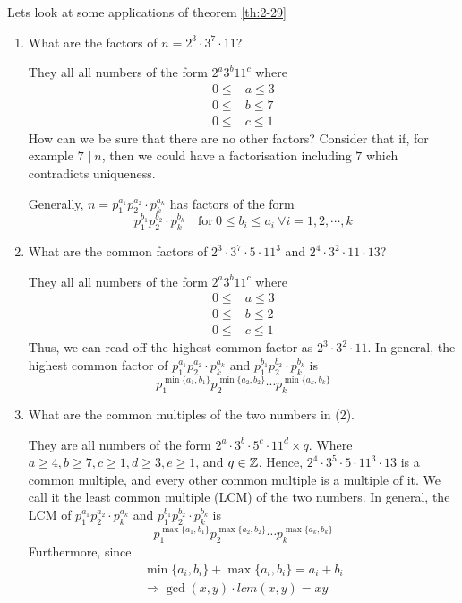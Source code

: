 \documentclass{article}
\begin{document}
Lets look at some applications of theorem \ref{th:2-29}
\begin{enumerate}[label=(\arabic*)]
    \item What are the factors of $n = 2^3 \cdot 3^7 \cdot 11$?
    
    They all all numbers of the form $2^a3^b11^c$ where
    \begin{align*}
        0 \leq &a \leq 3 \\
        0 \leq &b \leq 7 \\
        0 \leq &c \leq 1
    \end{align*}
    How can we be sure that there are no other factors? Consider that if, for example $7 \mid n$, then we could have a factorisation including $7$ which contradicts uniqueness.

    Generally, $n = p_1^{a_1}p_2^{a_2}\cdot p_k^{a_k}$ has factors of the form
    \[
        p_1^{b_1}p_2^{b_2}\cdot p_k^{b_k} \quad \text{for} \ 0 \leq b_i \leq a_i \ \forall i = 1, 2, \cdots, k
    \]

    \item What are the common factors of $2^3 \cdot 3^7 \cdot 5 \cdot 11^3$ and $2^4 \cdot 3^2 \cdot 11 \cdot 13$?
    
    They all all numbers of the form $2^a3^b11^c$ where
    \begin{align*}
        0 \leq &a \leq 3 \\
        0 \leq &b \leq 2 \\
        0 \leq &c \leq 1
    \end{align*}
    Thus, we can read off the highest common factor as $2^3\cdot3^2\cdot11$. In general, the highest common factor of $p_1^{a_1}p_2^{a_2}\cdot p_k^{a_k}$ and $p_1^{b_1}p_2^{b_2}\cdot p_k^{b_k}$ is
    \[
        p_1^{\min{\{a_1, b_1\}}}p_2^{\min{\{a_2, b_2\}}}\cdots p_k^{\min{\{a_k, b_k\}}}  
    \]

    \item What are the common multiples of the two numbers in (2).
    
    They are all numbers of the form $2^a\cdot3^b\cdot5^c\cdot11^d \times q$. Where $a\geq4, b\geq7, c\geq1, d\geq3, e\geq1$, and $q \in \mathbb{Z}$.
    Hence, $2^4\cdot3^5\cdot5\cdot11^3\cdot13$ is a common multiple, and every other common multiple is a multiple of it. 
    We call it the least common multiple (LCM) of the two numbers. In general, the LCM of $p_1^{a_1}p_2^{a_2}\cdot p_k^{a_k}$ and $p_1^{b_1}p_2^{b_2}\cdot p_k^{b_k}$ is
    \[
        p_1^{\max{\{a_1, b_1\}}}p_2^{\max{\{a_2, b_2\}}}\cdots p_k^{\max{\{a_k, b_k\}}}   
    \]
    Furthermore, since
    \begin{align*}
        \min{\{a_i, b_i\}} + \max{\{a_i, b_i\}} = a_i + b_i \\
        \Rightarrow \gcd(x,y) \cdot lcm(x,y) = xy
    \end{align*}


\end{enumerate}
\end{document}
